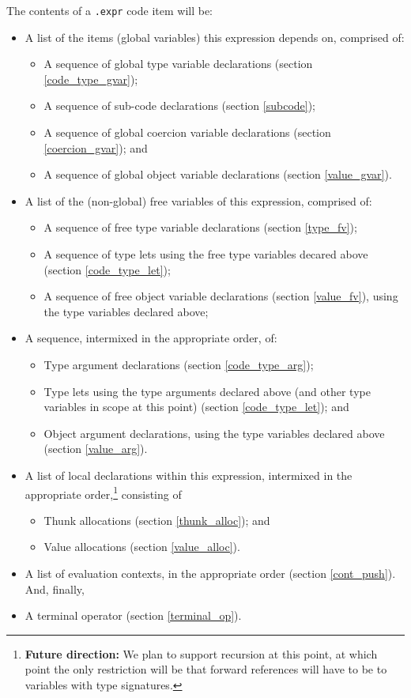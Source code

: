 \documentclass{report}
\newcommand\stringcode[1]{\texttt{#1}}
\newcommand\future[1]{\footnote{\textbf{Future direction:} #1}}
\begin{document}
The contents of a \stringcode{.expr} code item will be:
\begin{itemize}
    \item A list of the items (global variables) this expression depends on, comprised of:
        \begin{itemize}
            \item A sequence of global type variable declarations (section \ref{code_type_gvar});
            \item A sequence of sub-code declarations (section \ref{subcode});
            \item A sequence of global coercion variable declarations (section \ref{coercion_gvar}); and
            \item A sequence of global object variable declarations (section \ref{value_gvar}).
        \end{itemize}
    \item A list of the (non-global) free variables of this expression, comprised of:
        \begin{itemize}
            \item A sequence of free type variable declarations (section \ref{type_fv});
            \item A sequence of type lets using the free type variables decared above (section \ref{code_type_let});
            \item A sequence of free object variable declarations (section \ref{value_fv}), using the type variables declared above;
        \end{itemize}
    \item A sequence, intermixed in the appropriate order, of:
        \begin{itemize}
            \item Type argument declarations (section \ref{code_type_arg});
            \item Type lets using the type arguments declared above (and other type variables in scope at this point) (section \ref{code_type_let}); and
            \item Object argument declarations, using the type variables declared above (section \ref{value_arg}).
        \end{itemize}
    \item A list of local declarations within this expression,
        intermixed in the appropriate order,\future{We plan to support recursion at this point, at which point the only restriction will be that forward references will have to be to variables with type signatures.}
        consisting of
        \begin{itemize}
            \item Thunk allocations (section \ref{thunk_alloc}); and
            \item Value allocations (section \ref{value_alloc}).
        \end{itemize}
    \item A list of evaluation contexts, in the appropriate order (section \ref{cont_push}).
        And, finally,
    \item A terminal operator (section \ref{terminal_op}).
\end{itemize}
\end{document}
